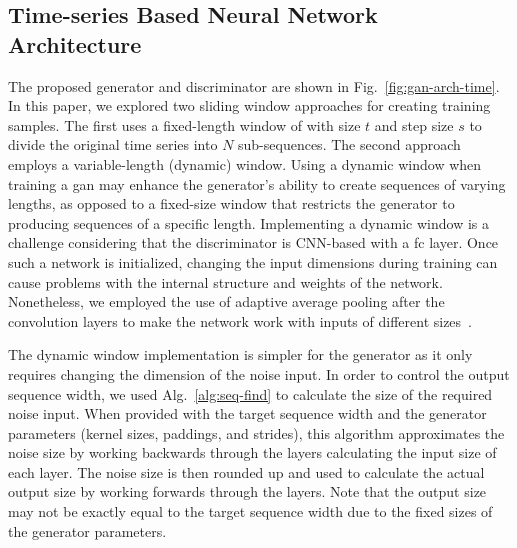 \subsection{Time-series Based Neural Network Architecture}
The proposed generator and discriminator are shown in Fig.~\ref{fig:gan-arch-time}. In this paper, we explored two sliding window approaches for creating training samples. The first uses a fixed-length window of with size $t$ and step size $s$ to divide the
original time series into $N$ sub-sequences. The second approach employs a variable-length (dynamic) window. Using a dynamic window when training a \gls*{gan} may enhance the generator's ability to create sequences of varying lengths, as opposed to a fixed-size window that restricts the generator to producing sequences of a specific length.
%
Implementing a dynamic window is a challenge considering that the discriminator is CNN-based with a \gls*{fc} layer. Once such a network is initialized, changing the input dimensions during training can cause problems with the internal structure and weights of the network. Nonetheless, we employed the use of adaptive average pooling after the convolution layers to make the network work with inputs of different sizes~\cite{he_spatial_2014}. 

The dynamic window implementation is simpler for the generator as it only requires changing the dimension of the noise input.  In order to control the output sequence width, we used Alg.~\ref{alg:seq-find} to calculate the size of the required noise input. When provided with the target sequence width and the generator parameters (kernel sizes, paddings, and strides), this algorithm approximates the noise size by working backwards through the layers calculating the input size of each layer. The noise size is then rounded up and used to calculate the actual output size by working forwards through the layers. Note that the output size may not be exactly equal to the target sequence width due to the fixed sizes of the generator parameters. 




